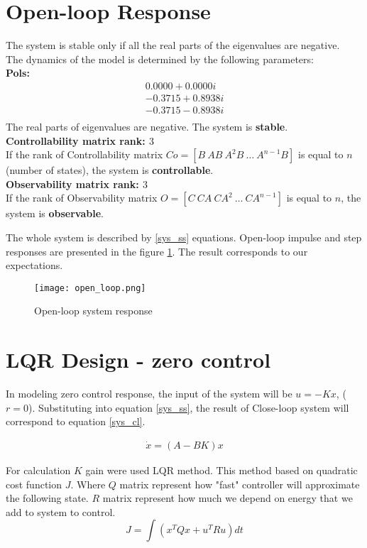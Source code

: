 \section{Open-loop Response}
The system is stable only if all the real parts of the eigenvalues are
negative. \\
The dynamics of the model is determined by the following parameters:\\
\textbf{Pols:}
\begin{align*}
   0.0000 + 0.0000i \\
  -0.3715 + 0.8938i \\
  -0.3715 - 0.8938i \\
\end{align*}
The real parts of eigenvalues are negative. The system is \textbf{stable}.\\
\textbf{Controllability matrix rank: $3$} \\
If the rank of Controllability matrix $Co = [ B\ AB\ A^2B\ \dots\ A^{n-1}B ]$
is equal to $n$ (number of states), the system is \textbf{controllable}. \\
\textbf{Observability matrix rank: $3$} \\
If the rank of Observability matrix $O = [ C\ CA\ CA^2\ \dots\ CA^{n-1} ]$
is equal to $n$, the system is \textbf{observable}.

The whole system is described by \ref{sys_ss} equations.
Open-loop impulse and step responses are presented in the figure
\ref{fig:open_loop}. The result corresponds to our expectations.

\begin{figure}[h!]
    \centering
    \texttt{[image: open\_loop.png]}
    \caption{Open-loop system response}
    \label{fig:open_loop}
\end{figure}


\pagebreak

\section{LQR Design - zero control}
In modeling zero control response, the input of the system
will be $u = -Kx$, ($r=0$). Substituting into equation \ref{sys_ss}, the
result of Close-loop system will correspond to equation \ref{sys_cl}.

\begin{align}\label{sys_cl}
    \dot{x} = (A-BK)x
\end{align}

For calculation $K$ gain were used LQR method. This method based on quadratic
cost function $J$. Where $Q$ matrix represent how "fast" controller will approximate 
the following state. 
$R$ matrix represent how much we depend on energy that we add to system to
control.
\begin{equation}
J=\int(x^TQx + u^TRu)dt
\end{equation}


